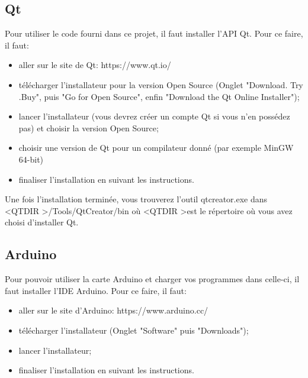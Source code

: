 \documentclass{article}
\begin{document}
	\subsection{Qt}
Pour utiliser le code fourni dans ce projet, il faut installer l'API Qt.
Pour ce faire, il faut:
\begin{itemize}
	\item aller sur le site de Qt: https://www.qt.io/
	\item télécharger l'installateur pour la version Open Source (Onglet "Download. Try .Buy", puis "Go for Open Source", enfin "Download the Qt Online Installer");
	\item lancer l'installateur (vous devrez créer un compte Qt si vous n'en possédez pas) et choisir la version Open Source;
	\item choisir une version de Qt pour un compilateur donné (par exemple MinGW 64-bit)
	\item finaliser l'installation en suivant les instructions.
\end{itemize}

Une fois l'installation terminée, vous trouverez l'outil qtcreator.exe dans \textless QTDIR \textgreater/Tools/QtCreator/bin où \textless QTDIR \textgreater est le répertoire où vous avez choisi d'installer Qt.

	\subsection{Arduino}
Pour pouvoir utiliser la carte Arduino et charger vos programmes dans celle-ci, il faut installer l'IDE Arduino.
Pour ce faire, il faut:
\begin{itemize}
	\item aller sur le site d'Arduino: https://www.arduino.cc/
	\item télécharger l'installateur (Onglet "Software" puis "Downloads");
	\item lancer l'installateur;
	\item finaliser l'installation en suivant les instructions.
\end{itemize}
\end{document}
